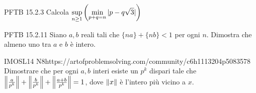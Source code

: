 \documentclass[12pt]{article}
\begin{document}
\begin{esercizio}{PFTB 15.2.3}{}
    Calcola $\displaystyle\sup_{n\ge1}\left( \min_{p+q=n} |p-q\sqrt3| \right)$
\end{esercizio}

\begin{esercizio}{PFTB 15.2.11}{}
    Siano $a,b$ reali tali che $\{na\}+\{nb\}<1$ per ogni $n$. Dimostra che almeno uno tra $a$ e $b$ è intero.
\end{esercizio}

\begin{esercizio}{IMOSL14 N8}{https://artofproblemsolving.com/community/c6h1113204p5083578}
    Dimostrare che per ogni $a,b$ interi esiste un $p^k$ dispari tale che $\left\lVert\frac{a}{p^k}\right\rVert+\left\lVert\frac{b}{p^k}\right\rVert+\left\lVert\frac{a+b}{p^k}\right\rVert=1$, dove $\left\lVert x\right\rVert$ è l'intero più vicino a $x$.
\end{esercizio}
\end{document}
